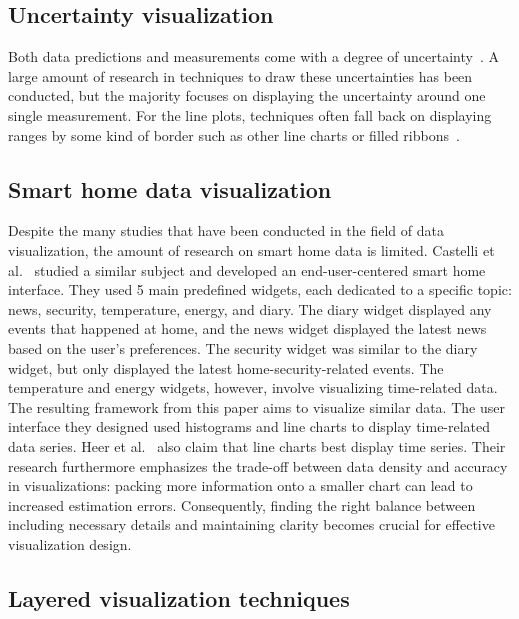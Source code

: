 \documentclass[journal]{IEEEtran}
\begin{document}
\subsection{Uncertainty visualization}

Both data predictions and measurements come with a degree of uncertainty~\cite{Padilla2021UncertainVisualizations}. A large amount of research in techniques to draw these uncertainties has been conducted, but the majority focuses on displaying the uncertainty around one single measurement. For the line plots, techniques often fall back on displaying ranges by some kind of border such as other line charts or filled ribbons~\cite{Kamal2021RecentSurvey, Padilla2021UncertainVisualizations, GrietheVisualizingMaking}.

\subsection{Smart home data visualization}

Despite the many studies that have been conducted in the field of data visualization, the amount of research on smart home data is limited. Castelli et al.~\cite{CastelliWhatVisualization} studied a similar subject and developed an end-user-centered smart home interface. They used 5 main predefined widgets, each dedicated to a specific topic: news, security, temperature, energy, and diary. The diary widget displayed any events that happened at home, and the news widget displayed the latest news based on the user's preferences. The security widget was similar to the diary widget, but only displayed the latest home-security-related events. The temperature and energy widgets, however, involve visualizing time-related data. The resulting framework from this paper aims to visualize similar data. The user interface they designed used histograms and line charts to display time-related data series. Heer et al.~\cite{Heer2009SizingVisualizations} also claim that line charts best display time series. Their research furthermore emphasizes the trade-off between data density and accuracy in visualizations: packing more information onto a smaller chart can lead to increased estimation errors. Consequently, finding the right balance between including necessary details and maintaining clarity becomes crucial for effective visualization design. 

\subsection{Layered visualization techniques}
\end{document}
